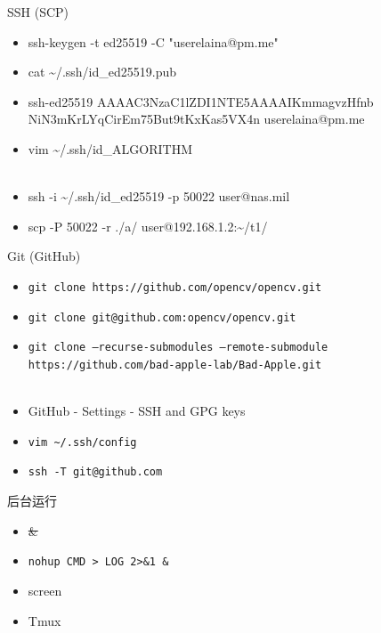 \documentclass{beamer}
\begin{document}
\begin{frame}{SSH (SCP)}
    \begin{itemize}
        \tt
        \item ssh-keygen -t ed25519 -C "userelaina@pm.me"
        \item cat \textasciitilde/.ssh/id\_ed25519.pub
        \item ssh-ed25519 AAAAC3NzaC1lZDI1NTE5AAAAIKmmagvzHfnb NiN3mKrLYqCirEm75But9tKxKas5VX4n userelaina@pm.me
        \item vim \textasciitilde/.ssh/id\_ALGORITHM
        \\ \quad \\
        \item ssh -i \textasciitilde/.ssh/id\_ed25519 -p 50022 user@nas.mil
        \item scp -P 50022 -r ./a/ user@192.168.1.2:\textasciitilde/t1/
    \end{itemize}
\end{frame}

\begin{frame}{Git (GitHub)}
    \begin{itemize}
        \item {\tt git clone https://github.com/opencv/opencv.git}
        \item {\tt git clone git@github.com:opencv/opencv.git}
        \item {\tt git clone --recurse-submodules --remote-submodule https://github.com/bad-apple-lab/Bad-Apple.git}
        \\ \quad \\
        \item GitHub - Settings - SSH and GPG keys
        \item {\tt vim \textasciitilde/.ssh/config}
        \item {\tt ssh -T git@github.com}
    \end{itemize}
\end{frame}

\begin{frame}{后台运行}
    \begin{itemize}
        \item \sout{\&}
        \item {\tt nohup CMD > LOG 2>\&1 \&}
        \item screen
        \item Tmux
    \end{itemize}
\end{frame}
\end{document}
